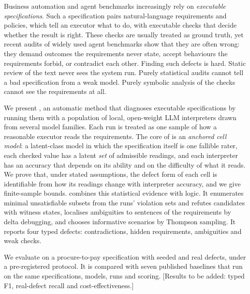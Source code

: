Business automation and agent benchmarks increasingly rely on \emph{executable specifications}. Such a specification pairs natural-language requirements and policies, which tell an executor what to do, with executable checks that decide whether the result is right. These checks are usually treated as ground truth, yet recent audits of widely used agent benchmarks show that they are often wrong: they demand outcomes the requirements never state, accept behaviours the requirements forbid, or contradict each other. Finding such defects is hard. Static review of the text never sees the system run. Purely statistical audits cannot tell a bad specification from a weak model. Purely symbolic analysis of the checks cannot see the requirements at all.

We present \specdx, an automatic method that diagnoses executable specifications by running them with a population of local, open-weight LLM interpreters drawn from several model families. Each run is treated as one sample of how a reasonable executor reads the requirements. The core of \specdx is an \emph{anchored cell model}: a latent-class model in which the specification itself is one fallible rater, each checked value has a latent \emph{set} of admissible readings, and each interpreter has an accuracy that depends on its ability and on the difficulty of what it reads. We prove that, under stated assumptions, the defect form of each cell is identifiable from how its readings change with interpreter accuracy, and we give finite-sample bounds. \specdx combines this statistical evidence with logic. It enumerates minimal unsatisfiable subsets from the runs' violation sets and refutes candidates with witness states, localises ambiguities to sentences of the requirements by delta debugging, and chooses informative scenarios by Thompson sampling. It reports four typed defects: contradictions, hidden requirements, ambiguities and weak checks.

We evaluate \specdx on a procure-to-pay specification with seeded and real defects, under a pre-registered protocol. It is compared with seven published baselines that run on the same specifications, models, runs and scoring. [Results to be added: typed F1, real-defect recall and cost-effectiveness.]
